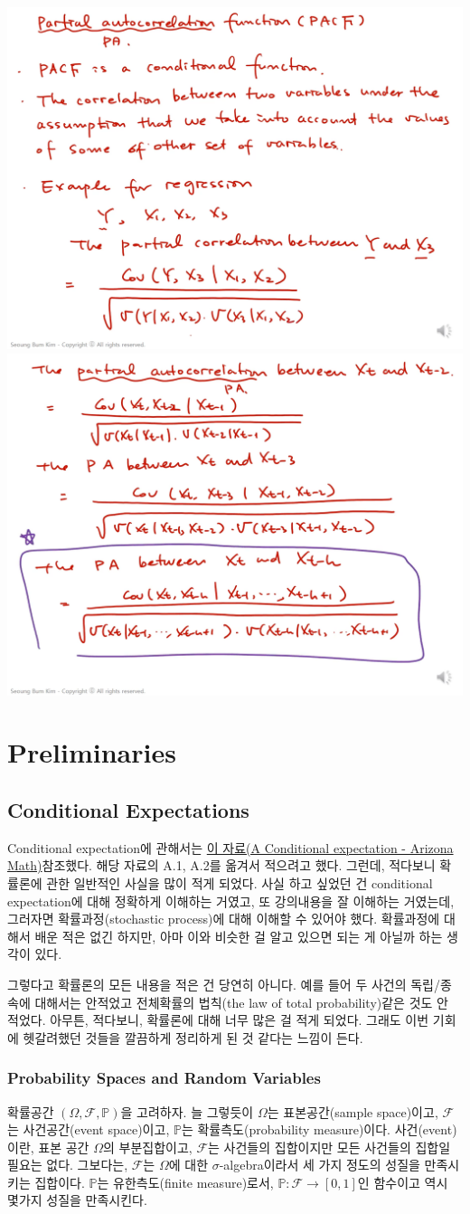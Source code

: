 \documentclass{article}
\begin{document}
\begin{center}
\includegraphics[width=.45\textwidth]{capture_11}
\includegraphics[width=.45\textwidth]{capture_12}
\end{center}

\section{Preliminaries}

\subsection{Conditional Expectations}

Conditional expectation에 관해서는 \href{https://www.math.arizona.edu/~tgk/464_07/cond_exp.pdf}{이 자료(A Conditional expectation - Arizona Math)}참조했다.
해당 자료의 A.1, A.2를 옮겨서 적으려고 했다.
그런데, 적다보니 확률론에 관한 일반적인 사실을 많이 적게 되었다.
사실 하고 싶었던 건 conditional expectation에 대해 정확하게 이해하는 거였고, 또 강의내용을 잘 이해하는 거였는데, 그러자면 확률과정(stochastic process)에 대해 이해할 수 있어야 했다.
확률과정에 대해서 배운 적은 없긴 하지만, 아마 이와 비슷한 걸 알고 있으면 되는 게 아닐까 하는 생각이 있다.

그렇다고 확률론의 모든 내용을 적은 건 당연히 아니다.
예를 들어 두 사건의 독립/종속에 대해서는 안적었고 전체확률의 법칙(the law of total probability)같은 것도 안 적었다.
아무튼, 적다보니, 확률론에 대해 너무 많은 걸 적게 되었다.
그래도 이번 기회에 헷갈려했던 것들을 깔끔하게 정리하게 된 것 같다는 느낌이 든다.

%
\subsubsection{Probability Spaces and Random Variables}
확률공간 \((\Omega,\mathcal F,\mathbb P)\)을 고려하자.
늘 그렇듯이 \(\Omega\)는 표본공간(sample space)이고, \(\mathcal F\)는 사건공간(event space)이고, \(\mathbb P\)는 확률측도(probability measure)이다.
사건(event)이란, 표본 공간 \(\Omega\)의 부분집합이고, \(\mathcal F\)는 사건들의 집합이지만 모든 사건들의 집합일 필요는 없다. 그보다는, \(\mathcal F\)는 \(\Omega\)에 대한 \(\sigma\)-algebra이라서 세 가지 정도의 성질을 만족시키는 집합이다.
\(\mathbb P\)는 유한측도(finite measure)로서, \(\mathbb P:\mathcal F\to[0,1]\)인 함수이고 역시 몇가지 성질을 만족시킨다.
\end{document}
